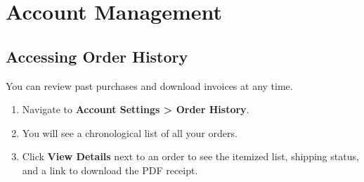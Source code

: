 \section{Account Management}

\subsection{Accessing Order History}
You can review past purchases and download invoices at any time.

\begin{enumerate}
    \item Navigate to \textbf{Account Settings > Order History}.
    \item You will see a chronological list of all your orders.
    \item Click \textbf{View Details} next to an order to see the itemized list, shipping status, and a link to download the PDF receipt.
\end{enumerate}
